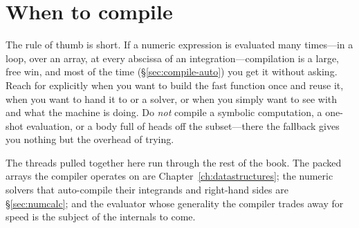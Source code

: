 \section{When to compile}
\label{sec:compile-when}

The rule of thumb is short. If a numeric expression is evaluated many times---in a
loop, over an array, at every abscissa of an integration---compilation is a large,
free win, and most of the time (\S\ref{sec:compile-auto}) you get it without
asking. Reach for  explicitly when you want to build the fast
function once and reuse it, when you want to hand it to  or a solver, or
when you simply want to see with  and 
what the machine is doing. Do \emph{not} compile a symbolic computation, a
one-shot evaluation, or a body full of heads off the subset---there the fallback
gives you nothing but the overhead of trying.

The threads pulled together here run through the rest of the book. The packed
arrays the compiler operates on are Chapter~\ref{ch:datastructures}; the numeric
solvers that auto-compile their integrands and right-hand sides are
\S\ref{sec:numcalc}; and the evaluator whose generality the compiler trades away
for speed is the subject of the internals to come.
